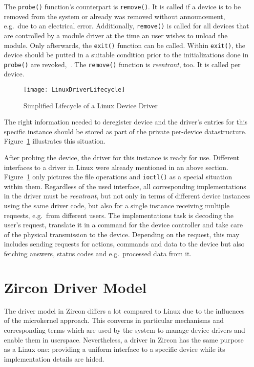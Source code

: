 The \texttt{probe()} function's counterpart is \texttt{remove()}.
It is called if a device is to be removed from the system or already was removed without announcement, e.g.\ due to an electrical error.
Additionally, \texttt{remove()} is called for all devices that are controlled by a module driver at the time an user wishes to unload the module.
Only afterwards, the \texttt{exit()} function can be called.
Within \texttt{exit()}, the device should be putted in a suitable condition prior to the initializations done in \texttt{probe()} are revoked\cite{lfd430},~\cite{quade2016Linux}.
The \texttt{remove()} function is \textit{reentrant}, too.
It is called per device.

\begin{figure} [ht]
    \centering
    \texttt{[image: LinuxDriverLifecycle]}
    \caption{Simplified Lifecycle of a Linux Device Driver}
    \label{pic:linux-lifecycle}
\end{figure}

The right information needed to deregister device and the driver's entries for this specific instance should be stored as part of the private per-device datastructure.
Figure~\ref{pic:linux-lifecycle} illustrates this situation.

After probing the device, the driver for this instance is ready for use.
Different interfaces to a driver in Linux were already mentioned in an above section.
Figure~\ref{pic:linux-lifecycle} only pictures the file operations and \texttt{ioctl()} as a special situation within them.
Regardless of the used interface, all corresponding implementations in the driver must be \textit{reentrant}, but not only in terms of different device instances using the same driver code, but also for a single instance receiving multiple requests, e.g.\ from different users.
The implementations task is decoding the user's request, translate it in a command for the device controller and take care of the physical transmission to the device.
Depending on the request, this may includes sending requests for actions, commands and data to the device but also fetching answers, status codes and e.g.\ processed data from it\cite{quade2016Linux}.


\section{Zircon Driver Model}
The driver model in Zircon differs a lot compared to Linux due to the influences of the microkernel approach.
This converns in particular mechanisms and corresponding terms which are used by the system to manage device drivers and enable them in userspace.
Nevertheless, a driver in Zircon has the same purpose as a Linux one: providing a uniform interface to a specific device while its implementation details are hided\cite{zircon-ddk-gettingstarted}. 

